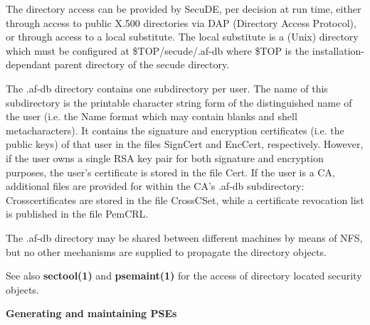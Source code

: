 The directory access can be provided 
by SecuDE, per decision at run time, either through access to public
X.500 directories via DAP (Directory Access Protocol), or through access
to a local substitute. The local substitute is a (Unix) directory
which must be configured at \$TOP/secude/.af-db where \$TOP
is the installation-dependant parent directory of the secude directory. 
 
The .af-db directory contains one subdirectory per user. The name of this
subdirectory is the printable character string form of the distinguished name of the user (i.e.
the Name format which may contain blanks and shell metacharacters). It
contains the signature and encryption certificates (i.e. the public
keys) of that user in the files SignCert and EncCert, respectively. However, if the user owns a single 
RSA key pair for both signature and encryption purposes, the user's certificate is stored in the file
Cert.
If the user is a CA, additional files are provided for within the CA's .af-db subdirectory: Crosscertificates 
are stored in the
file CrossCSet, while a certificate revocation list is published in the file PemCRL.
 
The .af-db directory may be shared between different machines by means of NFS, but no other 
mechanisms are supplied to propagate the directory objects. 
 
See also {\bf sectool(1)} and {\bf psemaint(1)} for the access of directory located security objects.
 
{\bf Generating and maintaining PSEs}

